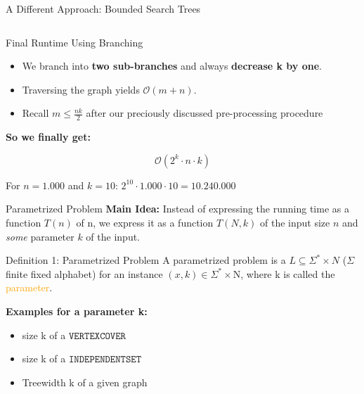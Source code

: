 \begin{frame}{A Different Approach: Bounded Search Trees}
\begin{columns}[T]
\begin{column}{.48\textwidth}
\begin{center}
\end{center}
    \end{column}
\end{columns}
\end{frame}


\begin{frame}[c]{Final Runtime Using Branching}

\begin{itemize}

\item We branch into \textbf{two sub-branches} and always \textbf{decrease k by one}.
\pause \item Traversing the graph yields  $\mathcal{O}(m+n)$.
\pause \item Recall $ m \leq \frac{nk}{2}$ after our preciously discussed pre-processing procedure
\end{itemize}

\textbf{So we finally  get: }

$$ \mathcal{O}(2^k \cdot n \cdot k)$$ 

For $n = 1.000$ and $k = 10$: $2^{10} \cdot 1.000 \cdot 10 = 10.240.000$ \dSmiley

\end{frame}

\begin{frame}[c]{Parametrized Problem}
\textbf{Main Idea:} Instead of expressing the running time as a function $T(n)$ of n, we express it as a function $T(N,k)$ of the input size $n$ and \textit{some} parameter $k$ of the input.


\begin{block}{Definition 1: Parametrized Problem}
A parametrized problem is a $L\subseteq\Sigma^*\times N$ ($\Sigma$ finite fixed alphabet) for an instance $(x,k)\in \Sigma^*\times \mathrm{N}$, where k is called the \textcolor{orange}{parameter}.
\end{block}
\textbf{Examples for a parameter k:}
\begin{itemize}
    \item size k of a $\mathtt{VERTEX COVER}$
    \item size k of a $\mathtt{INDEPENDENT SET}$
    \item Treewidth k of a given graph
\end{itemize}
\end{frame}


